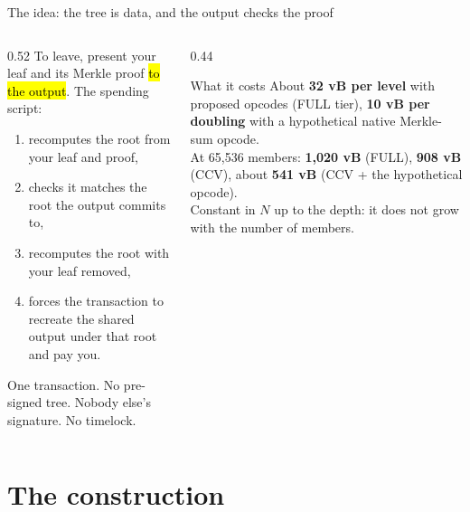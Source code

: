 \documentclass[aspectratio=169,10pt]{beamer}
\begin{document}
\begin{frame}{The idea: the tree is data, and the output checks the proof}
  \begin{columns}[T]
    \begin{column}{0.52\textwidth}
      To leave, present your leaf and its Merkle proof \hl{to the output}. The spending script:
      \begin{enumerate}
        \item recomputes the root from your leaf and proof,
        \item checks it matches the root the output commits to,
        \item recomputes the root with your leaf removed,
        \item forces the transaction to recreate the shared output under that root and pay you.
      \end{enumerate}
      \vspace{0.4em}
      One transaction. No pre-signed tree. Nobody else's signature. No timelock.
    \end{column}
    \begin{column}{0.44\textwidth}
      \begin{block}{What it costs}
        About \textbf{32 vB per level} with proposed opcodes (FULL tier),
        \textbf{10 vB per doubling} with a hypothetical native Merkle-sum opcode.\\[0.4em]
        At 65,536 members: \textbf{1,020 vB} (FULL), \textbf{908 vB} (CCV),
        about \textbf{541 vB} (CCV + the hypothetical opcode).\\[0.4em]
        Constant in $N$ up to the depth: it does not grow with the number of members.
      \end{block}
    \end{column}
  \end{columns}
\end{frame}

\section{The construction}
\end{document}
